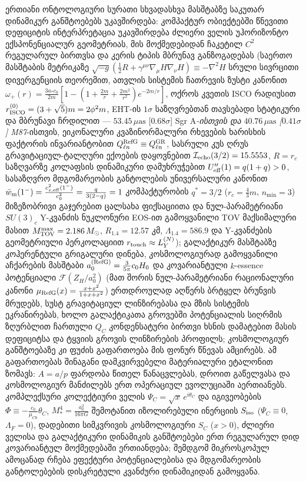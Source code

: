 \documentclass[11pt,a4paper]{article}
\begin{document}
ერთიანი ონტოლოგიური სურათი სხვადასხვა მასშტაბზე საკუთარ დინამიკურ განშტოებებს უკავშირდება: კომპაქტურ ობიექტებში წნევითი დეფიციტის ინტერპრეტაცია უკავშირდება ძლიერი ველის უჰორიზონტო ექსპონენციალურ გეომეტრიას, მის მოქმედებიდან ჩაკეტილ $C^2$ რეგულარულ ბირთვსა და კერის ტიპის მბრუნავ განზოგადებას (საერთო მასშტაბის მეტრიკაზე $\sqrt{-g}(\frac{1}{2}R + \gamma^{\mu\nu}\nabla_\mu H\nabla_\nu H) \equiv -\nabla^2 H$ სრული სივრცითი დივერგენციის თეორემით, ათვლის სისტემის ჩათრევის ზუსტი კანონით $\omega_+(r) = \frac{3a_* c_0}{2m}[1-(1+\frac{2m}{r}+\frac{2m^2}{r^2})e^{-2m/r}]$, ოქროს კვეთის ISCO რადიუსით $r_{\rm ISCO}^{(0)} = (3+\sqrt{5})m = 2\phi^2 m$, EHT-ის $1\sigma$ საზღვრებთან თავსებადი სტატიკური და მბრუნავი ჩრდილით — $53.45\,\mu\text{as}$ [$0.68\sigma$] Sgr A\emph{-ისთვის და $40.76\,\mu\text{as}$ [$0.41\sigma$] M87}-ისთვის, ეიკონალური კვაზინორმალური რხევების ხარისხის ფაქტორის ინვარიანტობით $Q_{\ell n}^{\rm RefG}\equiv Q_{\ell n}^{\rm GR}$, სასრული კუს ღრუს გრავიტაციულ-ტალღური ექოების დაყოვნებით $\mathcal{I}_{\rm echo}(3/2)=15.5553$, $R = r_c$ საზღვარზე კოლაფსის დინამიკური დამუხრუჭებით $U_{\rm eff}''(1) = q(1+q) > 0$, სასაზღვრო მდგომარეობის განტოლების უნივერსალური კანონით $\bar{w}_{\rm m}(1^-) = \frac{c_{s,\rm eff}^2(1^-)}{c_0^2} = \frac{q}{3(2-q)} = 1$ კომპაქტურობის $q^* = 3/2$ ($r_c = \frac{4}{3}m$, $n_{\min} = 3$) მიზეზობრივი გაჯერებით ცალსახა ფიქსაციითა და ნულ-პარამეტრიანი $SU(3)_c$ Y-კვანძის ნუკლონური EOS-ით გამოყვანილი TOV მაქსიმალური მასით $M_{\rm TOV}^{\max} = 2.186\,M_\odot$, $R_{1.4} = 12.57\text{ კმ}$, $\Lambda_{1.4} = 586.9$ და Y-კვანძების გეომეტრიული პერკოლაციით $r_{\rm touch} \approx L_Y^{(N)}$); გალაქტიკურ მასშტაბზე კოჰერენტული გრიგალური დინება, კოსმოლოგიურად გამოყვანილი აჩქარების მასშტაბი $a_0^{\rm (RefG)} = \frac{3}{5\pi}c_0 H_0$ და კოვარიანტული $k$-essence პოტენციალი $\mathcal{F}(Z_H/a_0^2)$ (მათ შორის ნულ-პარამეტრიანი რაციონალური კანონი $\mu_{\rm RefG}(x) = \frac{x+x^2}{1+x+x^2}$) ერთდროულად აღწერს ბრტყელ ბრუნვის მრუდებს, სუსტ გრავიტაციულ ლინზირებასა და მზის სისტემის ეკრანირებას, ხოლო გალაქტიკათა გროვებში პოტენციალის სიღრმის ზღურბლით ჩართული $Q_C$ კონდენსატური ბირთვი ხსნის დამატებით მასის დეფიციტსა და ტყვიის გროვის ლინზირების პროფილს; კოსმოლოგიურ განშტოებაზე კი ფუძის გაფართოება მის ფონურ წნევას ამცირებს. ამ გაფართოებას შინაგანი დამკვირვებელი მატერიალური ეტალონით ზომავს: $A=a/p$ ფარდობა წითელ წანაცვლებას, დროით გაწელვასა და კოსმოლოგიურ მანძილებს ერთ ოპერაციულ ევოლუციაში აერთიანებს. კომპლექსური კოლექტიური ველის $\Psi_C = \sqrt{x}\,e^{i\theta_C}$ და იგივეობების $\Phi \equiv -\frac{c_0}{\mu_{C0}}\theta_C$, $M_*^4 = \frac{a_0^2}{16\pi G}$ შემოტანით იზოლირებული ინერციის $S_{\rm iso}$ ($\Psi_C \equiv 0$, $\Lambda_F = 0$), დადებითი სიმკვრივის კოსმოლოგიური $S_C$ ($x > 0$), ძლიერი ველისა და გალაქტიკური დინამიკის განშტოებები ერთ რეგულარულ დიდ კოვარიანტულ მოქმედებაში ერთიანდება; შემდგომ მიკროსკოპულ ამოცანად რჩება ეფექტური პოტენციალებისა და მდგომარეობის განტოლებების დისკრეტული კვანძური დინამიკიდან გამოყვანა.
\end{document}
